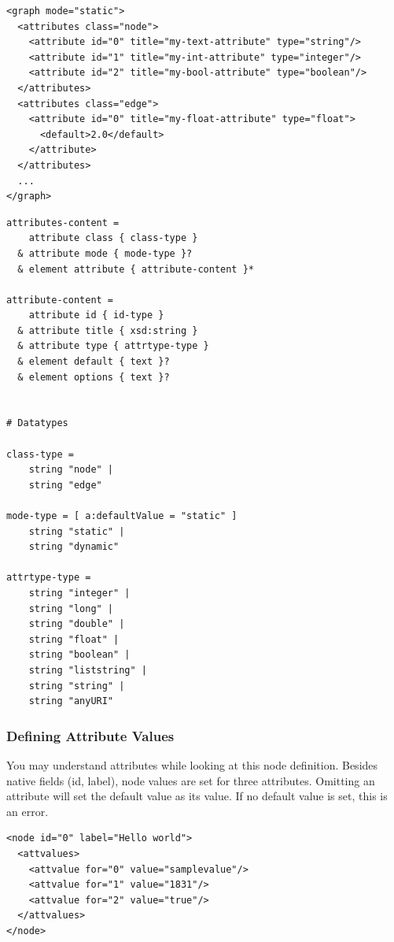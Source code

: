 \documentclass[a4paper,10pt]{article}
\begin{document}
\lstset{ style=gexf }
\begin{lstlisting}[caption={Attributes Definition},label=attributesDef]
<graph mode="static">
  <attributes class="node">
    <attribute id="0" title="my-text-attribute" type="string"/>
    <attribute id="1" title="my-int-attribute" type="integer"/>
    <attribute id="2" title="my-bool-attribute" type="boolean"/>
  </attributes>
  <attributes class="edge">
    <attribute id="0" title="my-float-attribute" type="float">
      <default>2.0</default>
    </attribute>
  </attributes>
  ...
</graph>
\end{lstlisting}

\lstset{ style=rnc }
\begin{lstlisting}[caption={Attributes Specification},label=attributesRNC]
attributes-content =
    attribute class { class-type }
  & attribute mode { mode-type }?
  & element attribute { attribute-content }*

attribute-content =
    attribute id { id-type }
  & attribute title { xsd:string }
  & attribute type { attrtype-type }
  & element default { text }?
  & element options { text }?


# Datatypes

class-type =
    string "node" |
    string "edge"

mode-type = [ a:defaultValue = "static" ]
    string "static" |
    string "dynamic"

attrtype-type =
    string "integer" |
    string "long" |
    string "double" |
    string "float" |
    string "boolean" |
    string "liststring" |
    string "string" |
    string "anyURI"
\end{lstlisting}

\subsubsection{Defining Attribute Values}

You may understand attributes while looking at this node definition. Besides native fields (id, label), node values are set for three attributes. Omitting an attribute will set the default value as its value. If no default value is set, this is an error.

\lstset{ style=gexf }
\begin{lstlisting}[caption={Node Attributes},label=nodeattributes]
<node id="0" label="Hello world">
  <attvalues>
    <attvalue for="0" value="samplevalue"/>
    <attvalue for="1" value="1831"/>
    <attvalue for="2" value="true"/>
  </attvalues>
</node>
\end{lstlisting}
\end{document}
